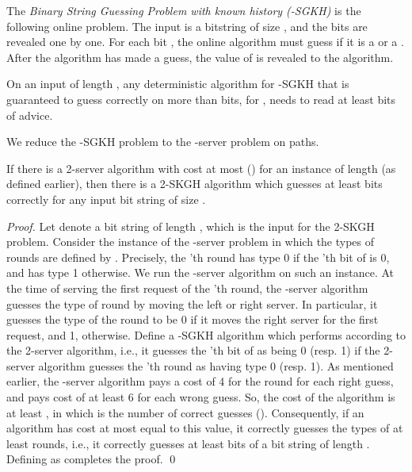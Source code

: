 \begin{definition}
The {\em Binary String Guessing Problem with known history (-SGKH)} is the following online problem. The input is a bitstring of size , and the bits are revealed one by one. For each bit , the online algorithm \alg must guess if it is a  or a . After the algorithm has made a guess, the value of  is revealed to the algorithm.
\end{definition}

\begin{lemma} \label{servi}
On an input of length , any deterministic algorithm for -SGKH that is guaranteed to guess correctly on more than  bits, for , 
needs to read at least  bits of advice.
\end{lemma}

We reduce the -SGKH problem to the -server problem on paths. 
\begin{lemma}\label{redu1}
If there is a 2-server algorithm with cost at most  () for an instance of length  (as defined earlier), then 
there is a 2-SKGH algorithm which guesses at least  bits correctly for any input bit string of size .
\end{lemma}

\begin{proof}
Let  denote a bit string of length , which is the input for the 2-SKGH problem. Consider the instance of the -server problem in which the types of rounds are defined by . Precisely, the 'th round has type 0 if the 'th bit of  is 0, and has type 1 otherwise. We run the -server algorithm on such an instance. At the time of serving the first request of the 'th round, the -server algorithm guesses the type of round  by moving the left or right server. In particular, it guesses the type of the round to be 0 if it moves the right server for the first request, and 1, otherwise. Define a -SGKH algorithm which performs according to the 2-server algorithm, i.e., it guesses the 'th bit of  as being 0 (resp. 1) if the 2-server algorithm guesses the 'th round as having type 0 (resp. 1). As mentioned earlier, the -server algorithm pays a cost of 4 for the round for each right guess, and pays cost of at least 6 for each wrong guess. So, the cost of the algorithm is at least , in which  is the number of correct guesses (). Consequently, if an algorithm has cost at most equal to this value, it correctly guesses the types of at least  rounds, i.e., it correctly guesses at least  bits of a bit string of length . Defining  as  completes the proof. \qed
\end{proof}

